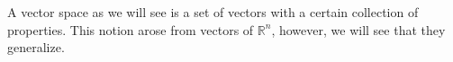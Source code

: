 %
%

A vector space as we will see is a set of vectors with a certain collection of properties.  This notion arose from vectors of $\mathbb{R}^n$, however, we will see that they generalize.  

